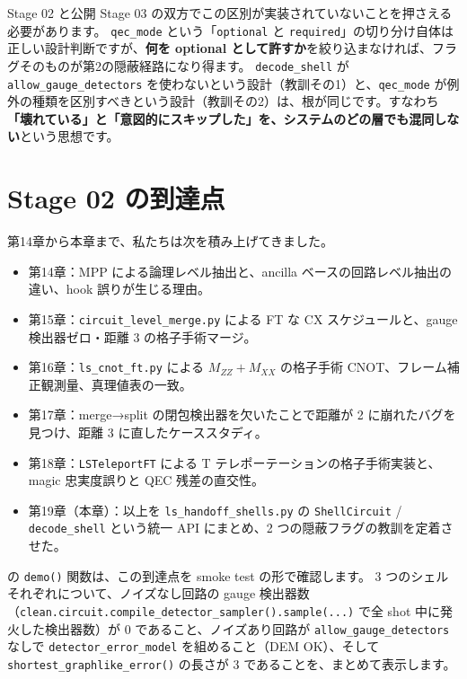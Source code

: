 Stage 02 と公開 Stage 03 の双方でこの区別が実装されていないことを押さえる必要があります。
\texttt{qec\_mode} という「\texttt{optional} と \texttt{required}」の切り分け自体は正しい設計判断ですが、\textbf{何を optional として許すか}を絞り込まなければ、フラグそのものが第2の隠蔽経路になり得ます。
\texttt{decode\_shell} が \texttt{allow\_gauge\_detectors} を使わないという設計（教訓その1）と、\texttt{qec\_mode} が例外の種類を区別すべきという設計（教訓その2）は、根が同じです。すなわち\textbf{「壊れている」と「意図的にスキップした」を、システムのどの層でも混同しない}という思想です。

\section{Stage 02 の到達点}\label{sec:stage_b_marker}

第14章から本章まで、私たちは次を積み上げてきました。

\begin{itemize}
  \item 第14章：MPP による論理レベル抽出と、ancilla ベースの回路レベル抽出の違い、hook 誤りが生じる理由。
  \item 第15章：\texttt{circuit\_level\_merge.py} による FT な CX スケジュールと、gauge 検出器ゼロ・距離 3 の格子手術マージ。
  \item 第16章：\texttt{ls\_cnot\_ft.py} による $M_{ZZ}+M_{XX}$ の格子手術 CNOT、フレーム補正観測量、真理値表の一致。
  \item 第17章：merge→split の閉包検出器を欠いたことで距離が 2 に崩れたバグを見つけ、距離 3 に直したケーススタディ。
  \item 第18章：\texttt{LSTeleportFT} による T テレポーテーションの格子手術実装と、magic 忠実度誤りと QEC 残差の直交性。
  \item 第19章（本章）：以上を \texttt{ls\_handoff\_shells.py} の \texttt{ShellCircuit} / \texttt{decode\_shell} という統一 API にまとめ、2 つの隠蔽フラグの教訓を定着させた。
\end{itemize}

 の \texttt{demo()} 関数は、この到達点を smoke test の形で確認します。
3 つのシェルそれぞれについて、ノイズなし回路の gauge 検出器数（\texttt{clean.circuit.compile\_detector\_sampler().sample(...)} で全 shot 中に発火した検出器数）が 0 であること、ノイズあり回路が \texttt{allow\_gauge\_detectors} なしで \texttt{detector\_error\_model} を組めること（DEM OK）、そして \texttt{shortest\_graphlike\_error()} の長さが 3 であることを、まとめて表示します。

